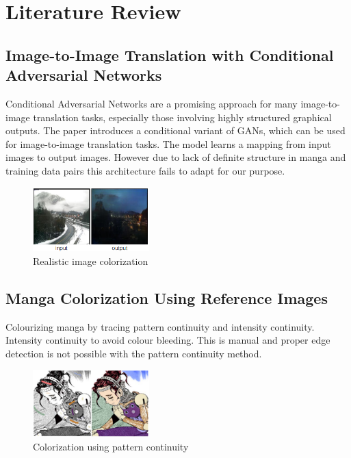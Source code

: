 \chapter{Literature Review}
	\section{Image-to-Image Translation with Conditional Adversarial Networks\cite{isola2018imagetoimage}}
   Conditional Adversarial Networks are a promising approach for many image-to-image translation tasks, especially those involving highly structured graphical outputs. The paper introduces a conditional variant of GANs, which can be used for image-to-image translation tasks. The model learns a mapping from input images to output images. However due to lack of definite structure in manga and training data pairs this architecture fails to adapt for our purpose.
   \begin{figure}[htbp]
    \centering
    \includegraphics[width=0.4\textwidth]{img/model0.png}
    \caption{Realistic image colorization}
    \label{fig:Model-0}
  \end{figure}
    \section{Manga Colorization Using Reference Images\cite{qu2006manga}}
    Colourizing manga by tracing pattern continuity and intensity continuity.
	Intensity continuity to avoid colour bleeding. This is manual and proper edge detection is not possible with the pattern continuity method.
    \begin{figure}[htbp]
    \centering
    \includegraphics[width=0.4\textwidth]{img/model1.png}
    \caption{Colorization using pattern continuity}
    \label{fig:Model-1}
  \end{figure}
    \newpage
